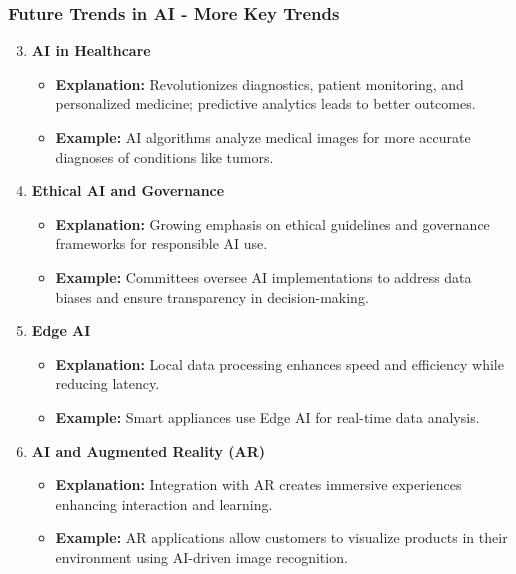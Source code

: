 \documentclass{beamer}
\begin{document}
\begin{frame}[fragile]
    \frametitle{Future Trends in AI - More Key Trends}
    \begin{enumerate}
        \setcounter{enumi}{2}
        \item \textbf{AI in Healthcare}
        \begin{itemize}
            \item \textbf{Explanation:} Revolutionizes diagnostics, patient monitoring, and personalized medicine; predictive analytics leads to better outcomes.
            \item \textbf{Example:} AI algorithms analyze medical images for more accurate diagnoses of conditions like tumors.
        \end{itemize}
        
        \item \textbf{Ethical AI and Governance}
        \begin{itemize}
            \item \textbf{Explanation:} Growing emphasis on ethical guidelines and governance frameworks for responsible AI use.
            \item \textbf{Example:} Committees oversee AI implementations to address data biases and ensure transparency in decision-making.
        \end{itemize}
        
        \item \textbf{Edge AI}
        \begin{itemize}
            \item \textbf{Explanation:} Local data processing enhances speed and efficiency while reducing latency.
            \item \textbf{Example:} Smart appliances use Edge AI for real-time data analysis.
        \end{itemize}
        
        \item \textbf{AI and Augmented Reality (AR)}
        \begin{itemize}
            \item \textbf{Explanation:} Integration with AR creates immersive experiences enhancing interaction and learning.
            \item \textbf{Example:} AR applications allow customers to visualize products in their environment using AI-driven image recognition.
        \end{itemize}
    \end{enumerate}
\end{frame}
\end{document}
